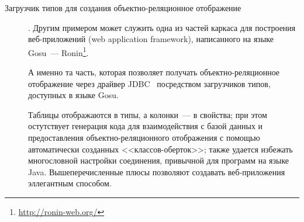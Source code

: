 \begin{description}

\item[Загрузчик типов для создания объектно-реляционное отображение]. Другим примером может служить одна из частей каркаса для построения веб-приложений (web application framework), написанного на языке Gosu~--- Ronin\footnote{\url{http://ronin-web.org/}}.

А именно та часть, которая позволяет получать объектно-реляционное отображение через драйвер JDBC~\cite{jdbc-book} посредством загрузчиков типов, доступных в языке Gosu.

Таблицы отображаются в типы, а колонки~--- в свойства; при этом остутствует генерация кода для взаимодействия с базой данных и предоставления объектно-реляционного отображения с помощью автоматически созданных <<классов-оберток>>; также удается избежать многословной настройки соединения, привычной для программ на языке Java.
Вышеперечисленные плюсы позволяют создавать веб-приложения эллегантным способом.

\end{description}

